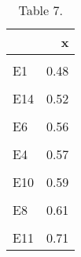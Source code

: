 \begin{table}[H]

\caption{Table 7.}
\centering
\fontsize{8}{10}\selectfont
\begin{tabular}[t]{lr}
\toprule
  & x\\
\midrule
\cellcolor{gray!6}{E2} & \cellcolor{gray!6}{0.45}\\
E1 & 0.48\\
\cellcolor{gray!6}{E13} & \cellcolor{gray!6}{0.52}\\
E14 & 0.52\\
\cellcolor{gray!6}{E3} & \cellcolor{gray!6}{0.54}\\
\addlinespace
E6 & 0.56\\
\cellcolor{gray!6}{E5} & \cellcolor{gray!6}{0.56}\\
E4 & 0.57\\
\cellcolor{gray!6}{E7} & \cellcolor{gray!6}{0.58}\\
E10 & 0.59\\
\addlinespace
\cellcolor{gray!6}{E12} & \cellcolor{gray!6}{0.61}\\
E8 & 0.61\\
\cellcolor{gray!6}{E9} & \cellcolor{gray!6}{0.65}\\
E11 & 0.71\\
\bottomrule
\end{tabular}
\end{table}
